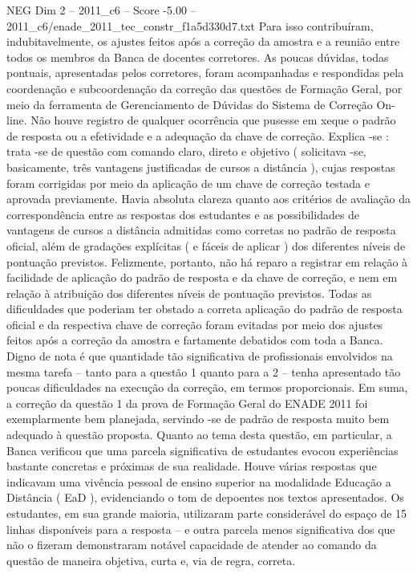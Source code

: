 \begin{textsample}{NEG Dim 2 – 2011\_c6 – Score -5.00 – 2011\_c6/enade\_2011\_tec\_constr\_f1a5d330d7.txt}
Para isso contribuíram, indubitavelmente, os ajustes feitos após a correção da amostra e a reunião entre todos os membros da Banca de docentes corretores.
As poucas dúvidas, todas pontuais, apresentadas pelos corretores, foram acompanhadas e respondidas pela coordenação e subcoordenação da correção das questões de Formação Geral, por meio da ferramenta de Gerenciamento de Dúvidas do Sistema de Correção On-line.
Não houve registro de qualquer ocorrência que pusesse em xeque o padrão de resposta ou a efetividade e a adequação da chave de correção.
Explica -se : trata -se de questão com comando claro, direto e objetivo ( solicitava -se, basicamente, três vantagens justificadas de cursos a distância ), cujas respostas foram corrigidas por meio da aplicação de um chave de correção testada e aprovada previamente.
Havia absoluta clareza quanto aos critérios de avaliação da correspondência entre as respostas dos estudantes e as possibilidades de vantagens de cursos a distância admitidas como corretas no padrão de resposta oficial, além de gradações explícitas ( e fáceis de aplicar ) dos diferentes níveis de pontuação previstos.
Felizmente, portanto, não há reparo a registrar em relação à facilidade de aplicação do padrão de resposta e da chave de correção, e nem em relação à atribuição dos diferentes níveis de pontuação previstos.
Todas as dificuldades que poderiam ter obstado a correta aplicação do padrão de resposta oficial e da respectiva chave de correção foram evitadas por meio dos ajustes feitos após a correção da amostra e fartamente debatidos com toda a Banca.
Digno de nota é que quantidade tão significativa de profissionais envolvidos na mesma tarefa – tanto para a questão 1 quanto para a 2 – tenha apresentado tão poucas dificuldades na execução da correção, em termos proporcionais.
Em suma, a correção da questão 1 da prova de Formação Geral do ENADE 2011 foi exemplarmente bem planejada, servindo -se de padrão de resposta muito bem adequado à questão proposta.
Quanto ao tema desta questão, em particular, a Banca verificou que uma parcela significativa de estudantes evocou experiências bastante concretas e próximas de sua realidade.
Houve várias respostas que indicavam uma vivência pessoal de ensino superior na modalidade Educação a Distância ( EaD ), evidenciando o tom de depoentes nos textos apresentados.
Os estudantes, em sua grande maioria, utilizaram parte considerável do espaço de 15 linhas disponíveis para a resposta – e outra parcela menos significativa dos que não o fizeram demonstraram notável capacidade de atender ao comando da questão de maneira objetiva, curta e, via de regra, correta.

\end{textsample}
